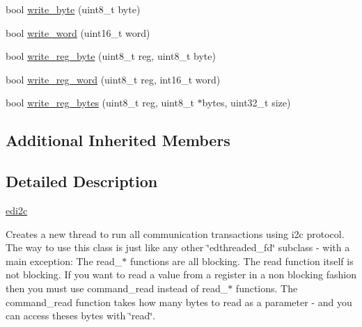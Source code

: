 \begin{DoxyCompactItemize}
\item 
bool \hyperlink{classedi2c_a245ebdd9ac48c5671de79bebccf29e97}{write\-\_\-byte} (uint8\-\_\-t byte)
\item 
bool \hyperlink{classedi2c_a31d8723f4c2678c2709fdff8e0b36f67}{write\-\_\-word} (uint16\-\_\-t word)
\item 
bool \hyperlink{classedi2c_ad54e95daa301895c7be525768ce0512a}{write\-\_\-reg\-\_\-byte} (uint8\-\_\-t reg, uint8\-\_\-t byte)
\item 
bool \hyperlink{classedi2c_a220239a9eb19a4e0cb760e81259a25a4}{write\-\_\-reg\-\_\-word} (uint8\-\_\-t reg, int16\-\_\-t word)
\item 
bool \hyperlink{classedi2c_a19785c35d613e72285234d194a294a09}{write\-\_\-reg\-\_\-bytes} (uint8\-\_\-t reg, uint8\-\_\-t $\ast$bytes, uint32\-\_\-t size)
\end{DoxyCompactItemize}
\subsection*{Additional Inherited Members}


\subsection{Detailed Description}
\hyperlink{classedi2c}{edi2c} 

Creates a new thread to run all communication transactions using i2c protocol. The way to use this class is just like any other \char`\"{}edthreaded\-\_\-fd\char`\"{} subclass -\/ with a main exception\-: The read\-\_\-$\ast$ functions are all blocking. The read function itself is not blocking. If you want to read a value from a register in a non blocking fashion then you must use command\-\_\-read instead of read\-\_\-$\ast$ functions. The command\-\_\-read function takes how many bytes to read as a parameter -\/ and you can access theses bytes with \char`\"{}read\char`\"{}. 

